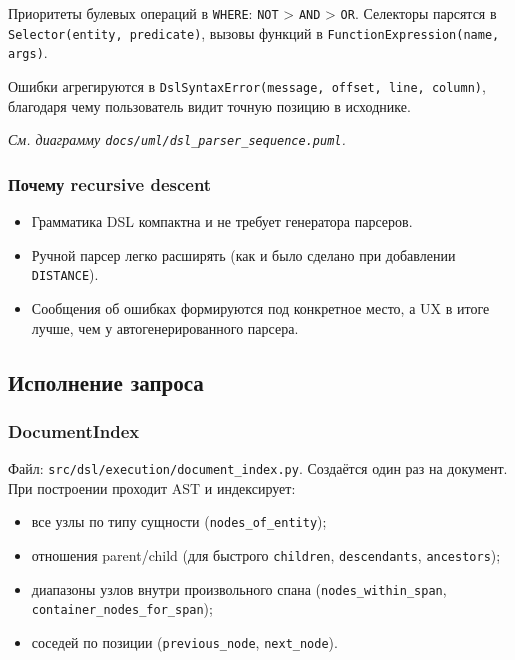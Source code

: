 \documentclass[12pt,a4paper]{article}
\newcommand{\uml}[1]{\textit{См. диаграмму \texttt{docs/uml/#1}.}}
\newcommand{\code}[1]{\texttt{#1}}
\begin{document}
Приоритеты булевых операций в \code{WHERE}:
\code{NOT} > \code{AND} > \code{OR}. Селекторы парсятся в
\code{Selector(entity, predicate)}, вызовы функций в
\code{FunctionExpression(name, args)}.

Ошибки агрегируются в \code{DslSyntaxError(message, offset, line,
column)}, благодаря чему пользователь видит точную позицию в исходнике.

\uml{dsl\_parser\_sequence.puml}

\subsubsection{Почему recursive descent}

\begin{itemize}
  \item Грамматика DSL компактна и не требует генератора парсеров.
  \item Ручной парсер легко расширять (как и было сделано при
        добавлении \code{DISTANCE}).
  \item Сообщения об ошибках формируются под конкретное место,
        а UX в итоге лучше, чем у автогенерированного парсера.
\end{itemize}

\subsection{Исполнение запроса}

\subsubsection{DocumentIndex}

Файл: \code{src/dsl/execution/document\_index.py}. Создаётся один раз
на документ. При построении проходит AST и индексирует:

\begin{itemize}
  \item все узлы по типу сущности (\code{nodes\_of\_entity});
  \item отношения parent/child (для быстрого \code{children},
        \code{descendants}, \code{ancestors});
  \item диапазоны узлов внутри произвольного спана
        (\code{nodes\_within\_span}, \code{container\_nodes\_for\_span});
  \item соседей по позиции (\code{previous\_node}, \code{next\_node}).
\end{itemize}
\end{document}
